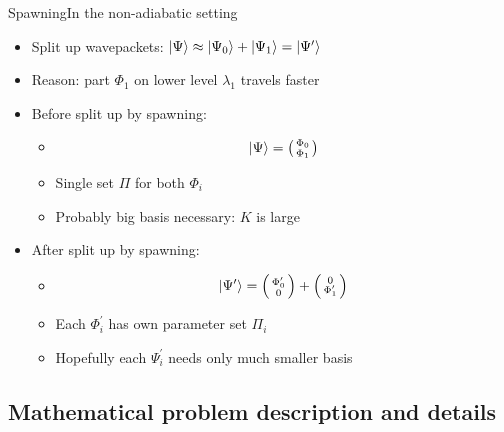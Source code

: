\documentclass{beamer}
\begin{document}
\begin{frame}{Spawning}{In the non-adiabatic setting}
  \begin{itemize}
    \item Split up wavepackets: $\Ket{\Psi} \approx \Ket{\Psi_0} + \Ket{\Psi_1} = \Ket{\Psi^\prime}$
    \item Reason: part $\Phi_1$ on lower level $\lambda_1$ travels faster
    \item Before split up by spawning:
    \begin{itemize}
      \item
      \begin{equation*}
        \Ket{\Psi} = \left(\begin{smallmatrix} \Phi_0 \\ \Phi_1 \end{smallmatrix} \right)
      \end{equation*}
      \item Single set $\Pi$ for both $\Phi_i$
      \item Probably big basis necessary: $K$ is large
    \end{itemize}
    \item After split up by spawning:
    \begin{itemize}
      \item
      \begin{equation*}
        \Ket{\Psi^\prime} = \left(\begin{smallmatrix} \Phi_0^\prime \\ 0 \end{smallmatrix} \right)
                          + \left(\begin{smallmatrix} 0 \\ \Phi_1^\prime \end{smallmatrix} \right)
      \end{equation*}
      \item Each $\Phi_i^\prime$ has own parameter set $\Pi_i$
      \item Hopefully each $\Psi_i^\prime$ needs only much smaller basis
    \end{itemize}
  \end{itemize}
\end{frame}


\subsection{Mathematical problem description and details}
\end{document}
